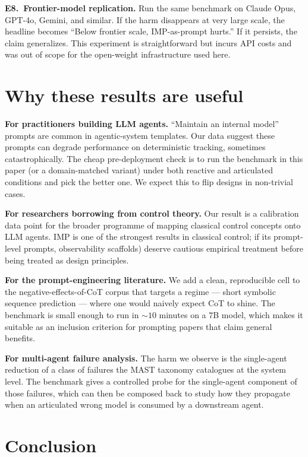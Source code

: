\documentclass[11pt]{article}
\begin{document}
\textbf{E8.\ Frontier-model replication.}  Run the same benchmark
on Claude Opus, GPT-4o, Gemini, and similar.  If the harm
disappears at very large scale, the headline becomes
``Below frontier scale, IMP-as-prompt hurts.''  If it persists,
the claim generalizes.  This experiment is straightforward but
incurs API costs and was out of scope for the open-weight
infrastructure used here.

\section{Why these results are useful}
\label{sec:usefulness}

\textbf{For practitioners building LLM agents.}  ``Maintain an
internal model'' prompts are common in agentic-system templates.
Our data suggest these prompts can degrade performance on
deterministic tracking, sometimes catastrophically.  The cheap
pre-deployment check is to run the benchmark in this paper (or a
domain-matched variant) under both reactive and articulated
conditions and pick the better one.  We expect this to flip
designs in non-trivial cases.

\textbf{For researchers borrowing from control theory.}  Our
result is a calibration data point for the broader programme of
mapping classical control concepts onto LLM agents.  IMP is one of
the strongest results in classical control; if its prompt-level
prompts, observability scaffolds) deserve cautious empirical
treatment before being treated as design principles.

\textbf{For the prompt-engineering literature.}  We add a clean,
reproducible cell to the negative-effects-of-CoT corpus
\citep{sprague2024cot} that targets a regime --- short symbolic
sequence prediction --- where one would naively expect CoT to
shine.  The benchmark is small enough to run in $\sim 10$ minutes
on a $7$B model, which makes it suitable as an inclusion criterion
for prompting papers that claim general benefits.

\textbf{For multi-agent failure analysis.}  The harm we observe
is the single-agent reduction of a class of failures the MAST
taxonomy \citep{cemri2025why} catalogues at the system level.  The
benchmark gives a controlled probe for the single-agent component
of those failures, which can then be composed back to study how
they propagate when an articulated wrong model is consumed by a
downstream agent.

\section{Conclusion}
\label{sec:conclusion}
\end{document}
